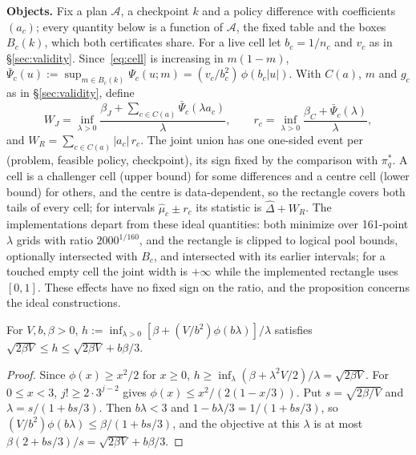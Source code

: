 \documentclass[sigconf,anonymous,review]{acmart}
\newcommand{\cA}{\mathcal{A}}
\begin{document}
\textbf{Objects.} Fix a plan $\cA$, a checkpoint $k$ and a policy difference with coefficients $(a_c)$; every quantity below is a function of $\cA$, the fixed table and the boxes $B_c(k)$, which both certificates share. For a live cell let $b_c = 1/n_c$ and $v_c$ as in \S\ref{sec:validity}. Since~\eqref{eq:cell} is increasing in $m(1-m)$, $\bar\Psi_c(u) := \sup_{m\in B_c(k)} \Psi_c(u;m) = (v_c/b_c^2)\,\phi(b_c|u|)$. With $C(a)$, $m$ and $g_c$ as in \S\ref{sec:validity}, define
\[
W_J = \inf_{\lambda>0}\frac{\beta_J + \sum_{c\in C(a)} \bar\Psi_c(\lambda a_c)}{\lambda},\qquad
r_c = \inf_{\lambda>0}\frac{\beta_C + \bar\Psi_c(\lambda)}{\lambda},
\]
and $W_R = \sum_{c\in C(a)} |a_c|\, r_c$. The joint union has one one-sided event per (problem, feasible policy, checkpoint), its sign fixed by the comparison with $\pi^*_q$. A cell is a challenger cell (upper bound) for some differences and a centre cell (lower bound) for others, and the centre is data-dependent, so the rectangle covers both tails of every cell; for intervals $\hat\mu_c \pm r_c$ its statistic is $\hat\Delta + W_R$. The implementations depart from these ideal quantities: both minimize over 161-point $\lambda$ grids with ratio $2000^{1/160}$, and the rectangle is clipped to logical pool bounds, optionally intersected with $B_c$, and intersected with its earlier intervals; for a touched empty cell the joint width is $+\infty$ while the implemented rectangle uses $[0,1]$. These effects have no fixed sign on the ratio, and the proposition concerns the ideal constructions.

\begin{lemma}\label{lem:sandwich}
For $V, b, \beta > 0$, $h := \inf_{\lambda>0}[\beta + (V/b^2)\phi(b\lambda)]/\lambda$ satisfies $\sqrt{2\beta V} \le h \le \sqrt{2\beta V} + b\beta/3$.
\end{lemma}
\begin{proof}
Since $\phi(x) \ge x^2/2$ for $x\ge0$, $h \ge \inf_\lambda(\beta + \lambda^2V/2)/\lambda = \sqrt{2\beta V}$. For $0 \le x < 3$, $j! \ge 2\cdot 3^{j-2}$ gives $\phi(x) \le x^2/(2(1-x/3))$. Put $s = \sqrt{2\beta/V}$ and $\lambda = s/(1+bs/3)$. Then $b\lambda < 3$ and $1 - b\lambda/3 = 1/(1+bs/3)$, so $(V/b^2)\phi(b\lambda) \le \beta/(1+bs/3)$, and the objective at this $\lambda$ is at most $\beta(2 + bs/3)/s = \sqrt{2\beta V} + b\beta/3$.
\end{proof}
\end{document}
